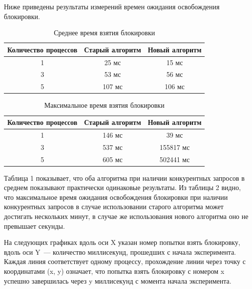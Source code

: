 Ниже приведены результаты измерений времен ожидания освобождения блокировки.

\begin{table}[H]
\caption{\label{tab:summary}Среднее время взятия блокировки}
\begin{center}
\begin{tabular}{|c|c|c|}
\hline
Количество процессов & Старый алгоритм & Новый алгоритм \\
\hline
1 & 25 мс & 15 мс \\
\hline
3 & 53 мс & 56 мс \\
\hline
5 & 107 мс & 106 мс \\
\hline
\end{tabular}
\end{center}

\end{table} \begin{table}[H]
\caption{\label{tab:summary}Максимальное время взятия блокировки}
\begin{center}
\begin{tabular}{|c|c|c|}
\hline
Количество процессов & Старый алгоритм & Новый алгоритм \\
\hline
1 & 146 мс & 39 мс \\
\hline
3 & 537 мс & 155817 мс \\
\hline
5 & 605 мс & 502441 мс \\
\hline
\end{tabular}
\end{center}
\end{table} 

Таблица 1 показывает, что оба алгоритма при наличии конкурентных запросов в среднем показывают практически одинаковые результаты.
Из таблицы 2 видно, что максимальное время ожидания освобождения блокировки при наличии конкурентных запросов в случае использовании старого алгоритма может достигать нескольких минут, в случае же использования нового алгоритма оно не превышает секунды.

На следующих графиках вдоль оси X указан номер попытки взять блокировку, вдоль оси Y~--- количество миллисекунд, прошедших с начала эксперимента. Каждая линия соответствует одному процессу, прохождение линии через точку с координатами (x, y) означает, что попытка взять блокировку с номером x успешно завершилась через y миллисекунд с момента начала эксперимента.

